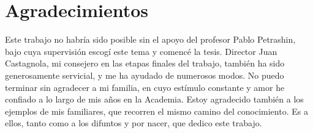\chapter*{Agradecimientos}
\thispagestyle{empty}
Este trabajo no habría sido posible sin el apoyo del profesor Pablo Petrashin,  bajo cuya supervisión escogí este tema y comencé la tesis. Director Juan Castagnola, mi consejero en las etapas finales
del trabajo, también ha sido generosamente servicial, y me ha ayudado de
numerosos modos.
No puedo terminar sin agradecer a mi familia, en cuyo estímulo constante y
amor he confiado a lo largo de mis años en la Academia. Estoy agradecido
también a los ejemplos de mis  familiares, que recorren el mismo camino del conocimiento. Es a ellos, tanto como a los difuntos y por nacer, que dedico este trabajo.